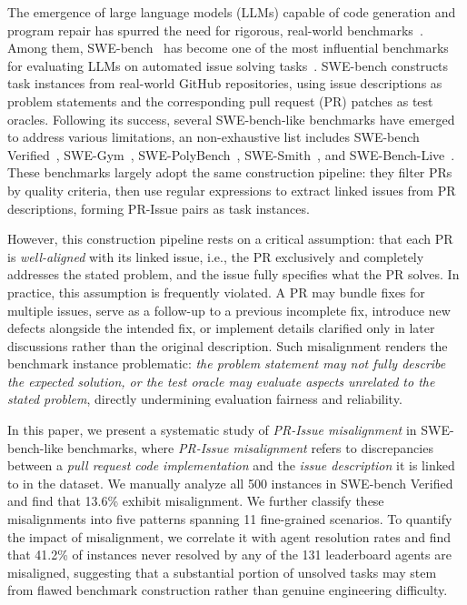 \documentclass[sigconf, review, anonymous]{acmart}
\begin{document}
    The emergence of large language models (LLMs) capable of code generation and
    program repair has spurred the need for rigorous, real-world benchmarks~\cite{swebench,
    jain2024livecodebenchholisticcontaminationfree, he2025sweperf,xu_aligning_2025, deng2025swepro}. Among them, SWE-bench~\cite{swebench} has become one of the most influential benchmarks for evaluating LLMs on automated issue solving tasks~\cite{team_trae_2025,xia_agentless_2024,minisweagent,zhang_autocoderover_2024, yang_kimi-dev_2025}. SWE-bench constructs task instances from real-world
    GitHub repositories, using issue descriptions as problem statements and the corresponding pull request (PR) patches as test oracles. Following its success, several SWE-bench-like
    benchmarks have emerged to address various limitations, an non-exhaustive list includes SWE-bench
    Verified~\cite{swebenchverified}, SWE-Gym~\cite{swegym}, SWE-PolyBench~\cite{swepoly}, SWE-Smith~\cite{swesmith}, and SWE-Bench-Live~\cite{swebenchlive}. These benchmarks largely adopt the same construction
    pipeline: they filter PRs by quality criteria, then use
    regular expressions to extract linked issues from PR descriptions,
    forming PR-Issue pairs as task instances.

    However, this construction pipeline rests on a critical
    assumption: that each PR is \textit{well-aligned} with its linked issue, i.e.,
    the PR exclusively and completely addresses the stated problem,
    and the issue fully specifies what the PR solves. In
    practice, this assumption is frequently violated. A PR may bundle fixes for
    multiple issues, serve as a follow-up to a previous incomplete
    fix, introduce new defects alongside the intended fix, or implement details clarified only in later discussions rather than the original description.
    Such misalignment renders the benchmark instance problematic:
    \textit{the problem statement may not fully describe the expected solution, or the test
    oracle may evaluate aspects unrelated to the stated problem}, directly
    undermining evaluation fairness and reliability.

In this paper, we present a systematic study of \textit{PR-Issue misalignment} in SWE-bench-like benchmarks, where \textit{PR-Issue misalignment} refers to discrepancies between a \textit{pull request code implementation} and the \textit{issue description} it is linked to in the dataset.
We manually analyze all 500 instances in SWE-bench Verified~\cite{swebenchverified} and find that 13.6\% exhibit misalignment. We further classify these misalignments into five patterns spanning 11 fine-grained scenarios. To quantify the impact of misalignment, we correlate it with agent resolution rates and find that 41.2\% of instances never resolved by any of the 131 leaderboard agents are misaligned, suggesting that a substantial portion of unsolved tasks may stem from flawed benchmark construction rather than genuine engineering difficulty.
\end{document}
